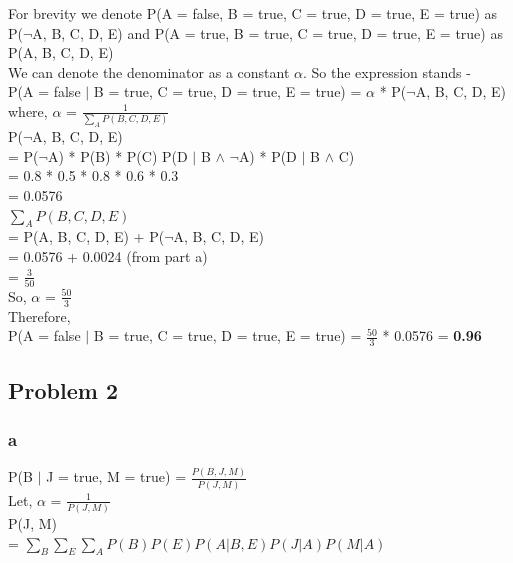 \documentclass{article}
\begin{document}
\noindent
For brevity we denote P(A = false, B = true, C = true, D = true, E = true) as P($\neg$A, B, C, D, E) and P(A = true, B = true, C = true, D = true, E = true) as P(A, B, C, D, E)\\

\noindent
We can denote the denominator as a constant $\alpha$. So the expression stands - \\
P(A = false $\vert$ B = true, C = true, D = true, E = true) = $\alpha$ * P($\neg$A, B, C, D, E) \\ where, $\alpha$ = $\frac{1}{\sum_{A} P(B, C, D, E)}$ \\

\noindent
P($\neg$A, B, C, D, E) \\
\indent
= P($\neg$A) * P(B) * P(C) P(D $\vert$ B $\land$ $\neg$A) * P(D $\vert$ B $\land$ C) \\ 
\indent 
= 0.8 * 0.5 * 0.8 * 0.6 * 0.3 \\
\indent 
= 0.0576 \\

\noindent
$\sum_{A} P(B, C, D, E)$ \\ 
\indent
= P(A, B, C, D, E) + P($\neg$A, B, C, D, E) \\
\indent 
= 0.0576 + 0.0024 (from part a)\\
\indent 
= \textbf{$\frac{3}{50}$} \\

\noindent
So, $\alpha$ = \textbf{$\frac{50}{3}$}\\

\noindent
Therefore, \\
P(A = false $\vert$ B = true, C = true, D = true, E = true) = $\frac{50}{3}$ * 0.0576 = \textbf{0.96}

\subsection*{Problem 2}
\subsubsection*{a} P(B $\vert$ J = true, M = true) = $\frac{P(B, J, M)}{P(J, M)}$ \\ 

\noindent 
Let, $\alpha$ = $\frac{1}{P(J, M)}$ \\

\noindent
P(J, M) \\ 

\indent 
= $\sum_{B}\sum_{E}\sum_{A}P(B)P(E)P(A \vert B, E)P(J \vert A)P(M \vert A)$ \\ 
\end{document}
